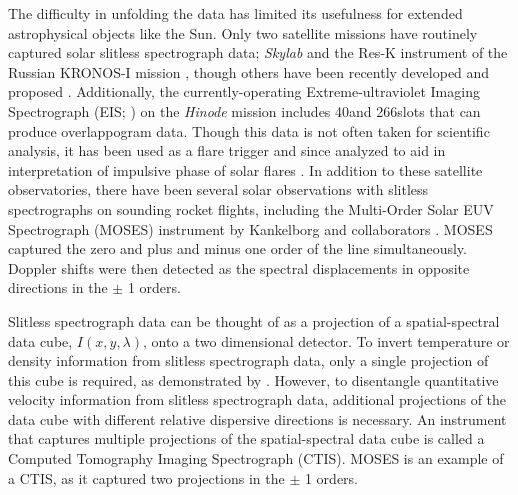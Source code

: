     The difficulty in unfolding the data has limited its usefulness for extended astrophysical objects like the Sun. 
    Only two satellite missions have routinely captured solar slitless spectrograph data; {\it Skylab} \citep{Tousey1973} and the Res-K instrument of the Russian KRONOS-I mission \citep{Zhitnik1998}, though others have been recently developed and proposed \citep{winebarger2019,golub2020}. Additionally, the currently-operating Extreme-ultraviolet Imaging Spectrograph (EIS; \citet{culhane2007}) on the {\it Hinode} mission \citep{kosugi2007} includes 40\arcsec and 266\arcsec slots that can produce overlappogram data.  Though this data is not often taken for scientific analysis, it has been used as a flare trigger and since analyzed to aid in interpretation of impulsive phase of solar flares \citep{harra2017,harra2020}.
    In addition to these satellite observatories, there have been several solar observations with slitless spectrographs on sounding rocket flights, including the Multi-Order Solar EUV Spectrograph (MOSES) instrument by Kankelborg and collaborators \citep{Kankelborg01,Fox10}.
     MOSES captured the zero and plus and minus one order of the \heii line simultaneously. Doppler shifts were then detected as the spectral displacements in opposite directions in the $\pm$ 1 orders.
    
    Slitless spectrograph data can be thought of as a projection of a spatial-spectral data cube, $I(x,y,\lambda)$, onto a two dimensional detector.  
    To invert temperature or density information from slitless spectrograph data, only a single projection of this cube is required, as demonstrated by \cite{winebarger2019}.  
    However, to disentangle quantitative velocity information from slitless spectrograph data, additional projections of the data cube with different relative dispersive directions is necessary.  
    An instrument that captures multiple projections of the spatial-spectral data cube is called a Computed Tomography Imaging Spectrograph (CTIS).  MOSES is an example of a CTIS, as it captured two projections in the $\pm$ 1 orders.  
    

